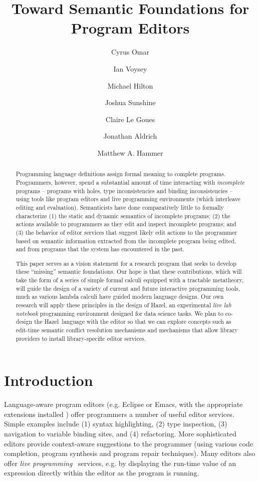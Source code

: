 \documentclass[letterpaper,USenglish]{lipics-v2016}
\title{Toward Semantic Foundations for Program Editors
}
\author[1]{Cyrus Omar}
\author[1]{Ian Voysey}
\author[2]{Michael Hilton}
\author[1]{Joshua Sunshine}
\author[1]{Claire Le Goues}
\author[1]{Jonathan Aldrich}
\author[3]{Matthew A. Hammer}
\affil[1]{Carnegie Mellon University, Pittsburgh, PA, USA\\
  \texttt{\{comar,iev,sunshine,clegoues,aldrich\}@cs.cmu.edu}}
\affil[2]{Oregon State University, Corvallis, OR, USA\\
\texttt{hiltonm@eecs.oregonstate.edu}}
\affil[3]{University of Colorado Boulder, Boulder, CO, USA\\
  \texttt{matthew.hammer@colorado.edu}}
\newcommand{\Hazel}[0]{\textsf{Hazel}}
\newcommand{\HazelEnv}[0]{\Hazel}
\begin{document}
\maketitle

\begin{abstract}
% 
Programming language definitions assign formal meaning to {complete}
programs.
%
Programmers, however, spend a substantial amount of time interacting
with \emph{incomplete} programs -- programs with holes, type inconsistencies and binding inconsistencies -- using tools like program editors and
live programming environments (which interleave editing and
evaluation).
%
Semanticists have done comparatively little to formally characterize (1) the static and dynamic semantics of incomplete programs; (2) the 
actions available to programmers as they edit and inspect incomplete programs; and (3) the behavior of editor services that suggest likely edit actions to the programmer based on semantic information extracted from the incomplete program being edited, and from programs that the system has encountered in the past.%

%
This paper serves as a vision statement for a research program that seeks to develop these ``missing'' semantic 
foundations. Our hope is that these contributions, which will take the form of a series of simple formal calculi equipped with a tractable metatheory, will guide the design of a variety of current and future interactive programming tools, much as various lambda calculi have guided modern language designs. Our own research will apply these principles in the design of \HazelEnv, an experimental \emph{live lab notebook} programming environment designed for data science tasks. We plan to co-design the \HazelEnv~language with the editor so that we can explore concepts such as edit-time semantic conflict resolution mechanisms and mechanisms that allow library providers to install library-specific editor services.



\end{abstract}


\section{Introduction}


Language-aware program editors (e.g. Eclipse
or Emacs, with the appropriate  
extensions installed \cite{gamma2004contributing}) offer programmers a number of useful editor services. Simple examples include (1)
syntax highlighting, (2)
type inspection, (3)
navigation to variable binding sites, and (4)
refactoring. More sophisticated editors provide context-aware suggestions to the programmer (using various code completion, program synthesis and program repair techniques). Many editors also offer \emph{live programming}~\cite{McDirmid:2007:LUL:1297027.1297073,Burckhardt:2013:ACF:2491956.2462170} services, e.g. by displaying the run-time value of an expression directly within the editor as the program is running. 
\end{document}
